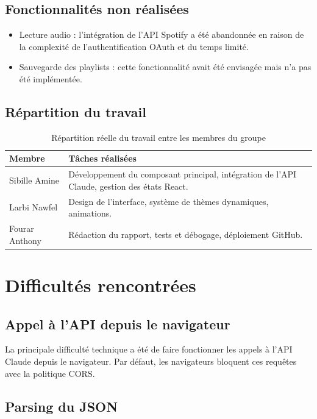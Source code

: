 \documentclass[a4paper, 12pt, twoside]{article}
\begin{document}
\subsection{Fonctionnalités non réalisées}

\begin{itemize}
    \item Lecture audio : l'intégration de l'API Spotify a été abandonnée en raison de la complexité de l'authentification OAuth et du temps limité.
    \item Sauvegarde des playlists : cette fonctionnalité avait été envisagée mais n'a pas été implémentée.
\end{itemize}

\subsection{Répartition du travail}

\begin{table}[H]
\centering
\begin{tabular}{|p{4cm}|p{9cm}|}
\hline
\textbf{Membre} & \textbf{Tâches réalisées} \\
\hline
Sibille Amine & Développement du composant principal, intégration de l'API Claude, gestion des états React. \\
\hline
Larbi Nawfel & Design de l'interface, système de thèmes dynamiques, animations. \\
\hline
Fourar Anthony & Rédaction du rapport, tests et débogage, déploiement GitHub. \\
\hline
\end{tabular}
\caption{Répartition réelle du travail entre les membres du groupe}
\end{table}

\section{Difficultés rencontrées}

\subsection{Appel à l'API depuis le navigateur}

La principale difficulté technique a été de faire fonctionner les appels à l'API Claude depuis le navigateur. Par défaut, les navigateurs bloquent ces requêtes avec la politique CORS.

\subsection{Parsing du JSON}
\end{document}
